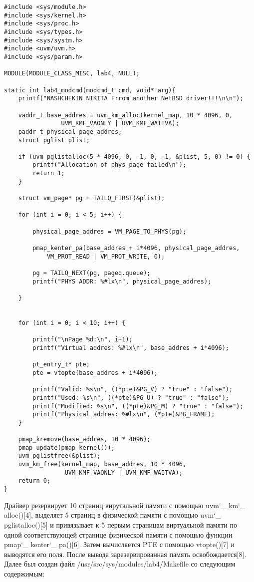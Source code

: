\documentclass[a4paper, 14pt]{extarticle}
\begin{document}
\begin{verbatim}
#include <sys/module.h>
#include <sys/kernel.h>
#include <sys/proc.h>
#include <sys/types.h>
#include <sys/systm.h>
#include <uvm/uvm.h>
#include <sys/param.h>

MODULE(MODULE_CLASS_MISC, lab4, NULL);

static int lab4_modcmd(modcmd_t cmd, void* arg){
	printf("NASHCHEKIN NIKITA Frrom another NetBSD driver!!!\n\n");

	vaddr_t base_addres = uvm_km_alloc(kernel_map, 10 * 4096, 0, 
				UVM_KMF_VAONLY | UVM_KMF_WAITVA);
	paddr_t physical_page_addres;
	struct pglist plist;

	if (uvm_pglistalloc(5 * 4096, 0, -1, 0, -1, &plist, 5, 0) != 0) {
		printf("Allocation of phys page failed\n");
		return 1;
	}	

	struct vm_page* pg = TAILQ_FIRST(&plist);
	
	for (int i = 0; i < 5; i++) {

		physical_page_addres = VM_PAGE_TO_PHYS(pg);
		
		pmap_kenter_pa(base_addres + i*4096, physical_page_addres, 
			VM_PROT_READ | VM_PROT_WRITE, 0);
		
		pg = TAILQ_NEXT(pg, pageq.queue);
		printf("PHYS ADDR: %#lx\n", physical_page_addres);
	
	}


	for (int i = 0; i < 10; i++) {
	
		printf("\nPage %d:\n", i+1);
		printf("Virtual addres: %#lx\n", base_addres + i*4096);
		
		pt_entry_t* pte;
		pte = vtopte(base_addres + i*4096);
		
		printf("Valid: %s\n", ((*pte)&PG_V) ? "true" : "false");
		printf("Used: %s\n", ((*pte)&PG_U) ? "true" : "false");
		printf("Modified: %s\n", ((*pte)&PG_M) ? "true" : "false");
		printf("Physical addres: %#lx\n", (*pte)&PG_FRAME); 
	}

	pmap_kremove(base_addres, 10 * 4096);
	pmap_update(pmap_kernel());	
	uvm_pglistfree(&plist);
	uvm_km_free(kernel_map, base_addres, 10 * 4096,
				 UVM_KMF_VAONLY | UVM_KMF_WAITVA);
	return 0;
}
\end{verbatim}

\begin{flushleft}
Драйвер резервирует 10 страниц вирутальной памяти с помощью uvm\char`_ km\char`_ alloc()[4], выделяет 5 страниц в физической памяти с помощью uvm\char`_ pglistalloc()[5] и привязывает к 5 первым страницам виртуальной памяти по одной соответствующей странице физической памяти с помощью функции pmap\char`_ kenter\char`_ pa()[6]. Затем вычисляется PTE с помощью vtopte()[7] и выводятся его поля. После вывода зарезервированная память освобождается[8].\newline
Далее был создан файл /usr/src/sys/modules/lab4/Makefile со следующим содержимым:
\end{flushleft}
\end{document}

